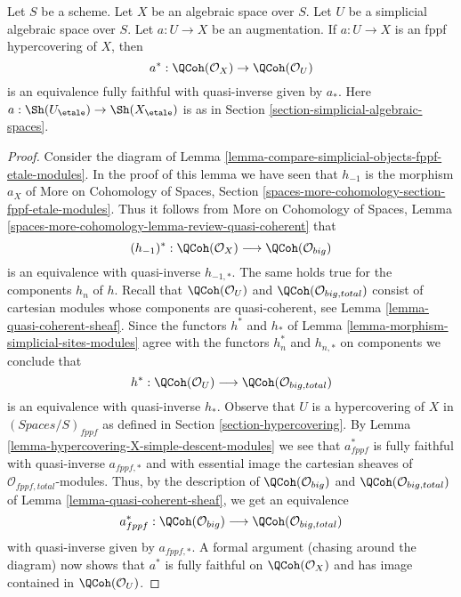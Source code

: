 \begin{lemma}
\label{lemma-descent-qcoh-for-fppf-hypercovering}
Let $S$ be a scheme. Let $X$ be an algebraic space over $S$.
Let $U$ be a simplicial algebraic space over $S$. Let $a : U \to X$
be an augmentation. If $a : U \to X$ is an fppf hypercovering of $X$,
then
$$
a^* : \QCoh(\mathcal{O}_X) \to \QCoh(\mathcal{O}_U)
$$
is an equivalence fully faithful with quasi-inverse given by $a_*$.
Here $a : \Sh(U_\etale) \to \Sh(X_\etale)$
is as in Section \ref{section-simplicial-algebraic-spaces}.
\end{lemma}

\begin{proof}
Consider the diagram of
Lemma \ref{lemma-compare-simplicial-objects-fppf-etale-modules}.
In the proof of this lemma we have seen that
$h_{-1}$ is the morphism $a_X$ of
More on Cohomology of Spaces, Section
\ref{spaces-more-cohomology-section-fppf-etale-modules}.
Thus it follows from
More on Cohomology of Spaces, Lemma
\ref{spaces-more-cohomology-lemma-review-quasi-coherent}
that
$$
(h_{-1})^* :
\QCoh(\mathcal{O}_X)
\longrightarrow
\QCoh(\mathcal{O}_{big})
$$
is an equivalence with quasi-inverse $h_{-1, *}$.
The same holds true for the components $h_n$ of $h$.
Recall that $\QCoh(\mathcal{O}_U)$ and $\QCoh(\mathcal{O}_{big, total})$
consist of cartesian modules whose components are quasi-coherent, see
Lemma \ref{lemma-quasi-coherent-sheaf}.
Since the functors $h^*$ and $h_*$ of
Lemma \ref{lemma-morphism-simplicial-sites-modules}
agree with the functors $h_n^*$ and $h_{n, *}$ on components
we conclude that
$$
h^* :
\QCoh(\mathcal{O}_U)
\longrightarrow 
\QCoh(\mathcal{O}_{big, total})
$$
is an equivalence with quasi-inverse $h_*$.
Observe that $U$ is a hypercovering of $X$ in $(\textit{Spaces}/S)_{fppf}$
as defined in Section \ref{section-hypercovering}.
By Lemma \ref{lemma-hypercovering-X-simple-descent-modules}
we see that $a_{fppf}^*$ is fully faithful with quasi-inverse
$a_{fppf, *}$ and with essential image the cartesian sheaves
of $\mathcal{O}_{fppf, total}$-modules.
Thus, by the description of $\QCoh(\mathcal{O}_{big})$ and
$\QCoh(\mathcal{O}_{big, total})$ of Lemma \ref{lemma-quasi-coherent-sheaf},
we get an equivalence
$$
a_{fppf}^* :
\QCoh(\mathcal{O}_{big})
\longrightarrow
\QCoh(\mathcal{O}_{big, total})
$$
with quasi-inverse given by $a_{fppf, *}$.
A formal argument (chasing around the diagram) now shows that
$a^*$ is fully faithful on $\QCoh(\mathcal{O}_X)$ and has
image contained in $\QCoh(\mathcal{O}_U)$.


\end{proof}
